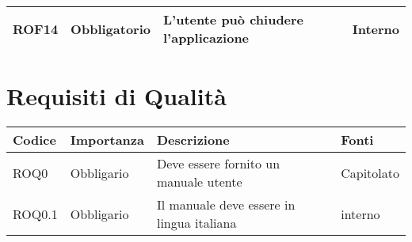 \documentclass[../AnalisideiRequisiti.tex]{subfiles}
\begin{document}
\begin{longtable}{| p{2cm} | p{2.5cm} |p{5cm} | p{2.5cm} |}
	
		
		\newline ROF14&\newline Obbligatorio&
		\newline L'utente può chiudere l'applicazione&
		\newline {}{UC5} \newline Interno
		\\[1em]
		\hline
		
		
	\end{longtable}
	\section{Requisiti di Qualità}
			\begin{longtable}{| p{2cm} | p{2.5cm} |p{5cm} | p{2.5cm} |}
			\hline
			\textbf{Codice} & \textbf{Importanza} & \textbf{Descrizione} & \textbf{Fonti}\\
			\hline
			\endhead
				
			
			\newline ROQ0&\newline Obbligario&
		\newline Deve essere fornito un manuale utente&
		\newline Capitolato
		\\[1em]
		\hline
			\newline ROQ0.1&\newline Obbligario&
			\newline Il manuale deve essere in lingua italiana&
			\newline interno
			\\[1em]
			\hline
	\end{longtable}
\newpage
\end{document}
